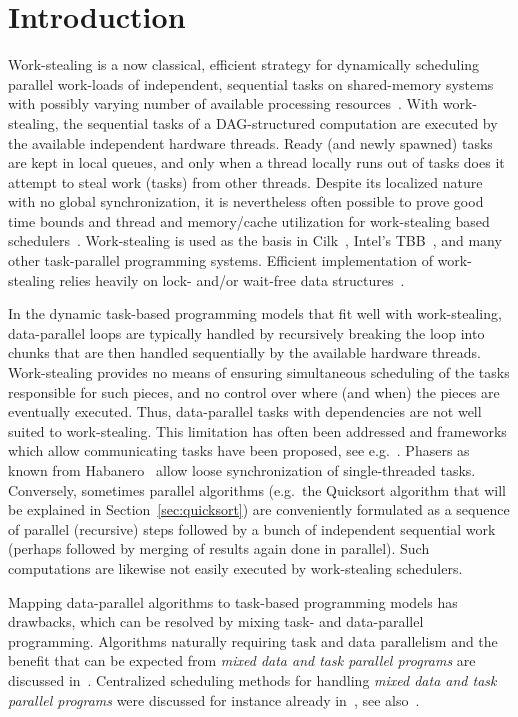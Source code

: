 \documentclass[preprint]{sigplanconf}
\begin{document}
\section{Introduction}

Work-stealing is a now classical, efficient strategy for dynamically
scheduling parallel work-loads of independent, sequential tasks on
shared-memory systems with possibly varying number of available
processing resources~\cite{BlumofeLeiserson99,AroraBlumofePlaxton01}.
With work-stealing, the sequential tasks of a DAG-structured
computation are executed by the available independent hardware
threads. Ready (and newly spawned) tasks are kept in local queues, and
only when a thread locally runs out of tasks does it attempt to steal
work (tasks) from other threads. Despite its localized nature with no
global synchronization, it is nevertheless often possible to prove
good time bounds and thread and memory/cache utilization for
work-stealing based schedulers~\cite{BlumofeLeiserson99,AroraBlumofePlaxton01}.
Work-stealing is used as the basis in
Cilk~\cite{BlumofeJoergKuszmaulLeisersonRandallZhou96}, Intel's
TBB~\cite{KukanovVoss07}, and many other task-parallel programming
systems.  Efficient implementation of work-stealing relies heavily on
lock- and/or wait-free data structures~\cite{HerlihyShavit08}.

In the dynamic task-based programming models that fit well with
work-stealing, data-parallel loops are typically handled by
recursively breaking the loop into chunks that are then handled
sequentially by the available hardware threads. Work-stealing provides
no means of ensuring simultaneous scheduling of the tasks responsible
for such pieces, and no control over where (and when) the pieces are
eventually executed. Thus, data-parallel tasks with dependencies are
not well suited to work-stealing. This limitation has often been
addressed and frameworks which allow communicating tasks have been
proposed, see e.g.~\cite{Dummler07}. Phasers as known from
Habanero~\cite{Shirako08} allow loose synchronization of
single-threaded tasks.  Conversely, sometimes parallel algorithms
(e.g.\ the Quicksort algorithm that will be explained in
Section~\ref{sec:quicksort}) are conveniently formulated as a sequence
of parallel (recursive) steps followed by a bunch of independent
sequential work (perhaps followed by merging of results again done in
parallel). Such computations are likewise not easily executed by
work-stealing schedulers.

Mapping data-parallel algorithms to task-based programming models has
drawbacks, which can be resolved by mixing task- and data-parallel
programming. Algorithms naturally requiring task and data parallelism
and the benefit that can be expected from \emph{mixed data and task
parallel programs} are discussed
in~\cite{ChakrabartiDemmelYelick97}. Centralized scheduling methods
for handling \emph{mixed data and task parallel programs} were
discussed for instance already in~\cite{ChakrabartiDemmelYelick97},
see
also~\cite{BoudetDesprezSuter03,CrowlCrovellaLeBlancScott94,DesprezSuter04,Dutot09,RadulescuGemund01,Rauber99,Rauber07}.
\end{document}
